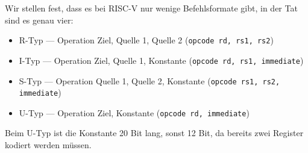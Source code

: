 Wir stellen fest, dass es bei RISC-V nur wenige Befehlsformate gibt, in der Tat sind es genau vier:

\begin{itemize}
\item R-Typ --- Operation Ziel, Quelle 1, Quelle 2 (\lstinline[style=risc-v_Assembler]!opcode rd, rs1, rs2!)
\item I-Typ --- Operation Ziel, Quelle 1, Konstante (\lstinline[style=risc-v_Assembler]!opcode rd, rs1, immediate!)
\item S-Typ --- Operation Quelle 1, Quelle 2, Konstante (\lstinline[style=risc-v_Assembler]!opcode rs1, rs2, immediate!)
\item U-Typ --- Operation Ziel, Konstante (\lstinline[style=risc-v_Assembler]!opcode rd, immediate!)
\end{itemize}

Beim U-Typ ist die Konstante 20 Bit lang, sonst 12 Bit, da bereits zwei Register kodiert werden müssen.
